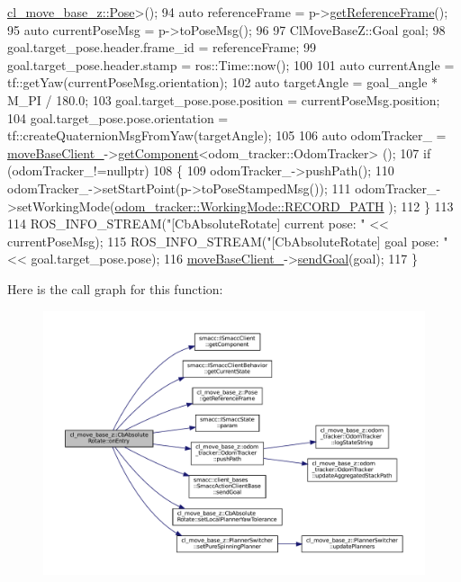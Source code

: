 \begin{DoxyCode}
      \hyperlink{classcl__move__base__z_1_1Pose}{cl\_move\_base\_z::Pose}>();
94     \textcolor{keyword}{auto} referenceFrame = p->\hyperlink{classcl__move__base__z_1_1Pose_af8c2dc151e74aa8da6b283d1c8563051}{getReferenceFrame}();
95     \textcolor{keyword}{auto} currentPoseMsg = p->toPoseMsg();
96 
97     ClMoveBaseZ::Goal goal;
98     goal.target\_pose.header.frame\_id = referenceFrame;
99     goal.target\_pose.header.stamp = ros::Time::now();
100 
101     \textcolor{keyword}{auto} currentAngle = tf::getYaw(currentPoseMsg.orientation);
102     \textcolor{keyword}{auto} targetAngle = goal\_angle * M\_PI / 180.0;
103     goal.target\_pose.pose.position = currentPoseMsg.position;
104     goal.target\_pose.pose.orientation = tf::createQuaternionMsgFromYaw(targetAngle);
105 
106     \textcolor{keyword}{auto} odomTracker\_ = \hyperlink{classcl__move__base__z_1_1CbMoveBaseClientBehaviorBase_ab2ef219464cfac8659b4a87c8d0db6d5}{moveBaseClient\_}->\hyperlink{classsmacc_1_1ISmaccClient_adef78db601749ca63c19e74a27cb88cc}{getComponent}<odom\_tracker::OdomTracker>
      ();
107     \textcolor{keywordflow}{if} (odomTracker\_!=\textcolor{keyword}{nullptr})
108     \{
109         odomTracker\_->pushPath();
110         odomTracker\_->setStartPoint(p->toPoseStampedMsg());
111         odomTracker\_->setWorkingMode(\hyperlink{namespacecl__move__base__z_1_1odom__tracker_ac46b05813b2791604f6cd0a39ace3ef8a023bc3adf68871ef7a0c616765ac80a7}{odom\_tracker::WorkingMode::RECORD\_PATH}
      );
112     \}
113 
114     ROS\_INFO\_STREAM(\textcolor{stringliteral}{"[CbAbsoluteRotate] current pose: "} << currentPoseMsg);
115     ROS\_INFO\_STREAM(\textcolor{stringliteral}{"[CbAbsoluteRotate] goal pose: "} << goal.target\_pose.pose);
116     \hyperlink{classcl__move__base__z_1_1CbMoveBaseClientBehaviorBase_ab2ef219464cfac8659b4a87c8d0db6d5}{moveBaseClient\_}->\hyperlink{classsmacc_1_1client__bases_1_1SmaccActionClientBase_a9c47a5094ac8afb01680307fe5eca922}{sendGoal}(goal);
117 \}
\end{DoxyCode}
Here is the call graph for this function\+:
\nopagebreak
\begin{figure}[H]
\begin{center}
\leavevmode
\includegraphics[width=350pt]{classcl__move__base__z_1_1CbAbsoluteRotate_a10418ea360809fa649d295716b152b2b_cgraph}
\end{center}
\end{figure}
